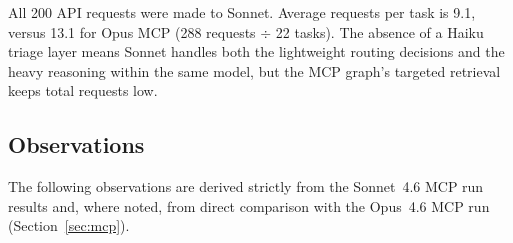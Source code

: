 \noindent
All 200 API requests were made to Sonnet.  Average requests per task
is 9.1, versus 13.1 for Opus MCP (288 requests $\div$ 22 tasks).
The absence of a Haiku triage layer means Sonnet handles both the
lightweight routing decisions and the heavy reasoning within the same
model, but the MCP graph's targeted retrieval keeps total requests low.

\subsection{Observations}\label{sec:mcp-sonnet-obs}

The following observations are derived strictly from the Sonnet~4.6 MCP
run results and, where noted, from direct comparison with the Opus~4.6
MCP run (Section~\ref{sec:mcp}).

